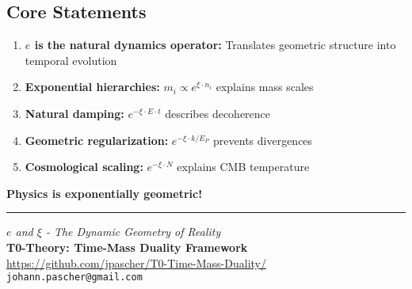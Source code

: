 \documentclass[12pt,a4paper]{article}
\begin{document}
	\subsection{Core Statements}
	
	\begin{enumerate}
		\item \textbf{$e$ is the natural dynamics operator:}
		Translates geometric structure into temporal evolution
		
		\item \textbf{Exponential hierarchies:} 
		$m_i \propto e^{\xi \cdot n_i}$ explains mass scales
		
		\item \textbf{Natural damping:}
		$e^{-\xi \cdot E \cdot t}$ describes decoherence
		
		\item \textbf{Geometric regularization:}
		$e^{-\xi \cdot k/E_P}$ prevents divergences
		
		\item \textbf{Cosmological scaling:}
		$e^{-\xi \cdot N}$ explains CMB temperature
	\end{enumerate}
	
	\begin{center}
		\vspace{0.5cm}
		\textbf{Physics is exponentially geometric!}
	\end{center}
	
	\vfill
	
	\begin{center}
		\hrule
		\vspace{0.5cm}
		\textit{$e$ and $\xi$ - The Dynamic Geometry of Reality}\\[0.2cm]
		\textbf{T0-Theory: Time-Mass Duality Framework}\\
		\url{https://github.com/jpascher/T0-Time-Mass-Duality/}\\
		\texttt{johann.pascher@gmail.com}
		\vspace{0.3cm}
	\end{center}
	
\end{document}
